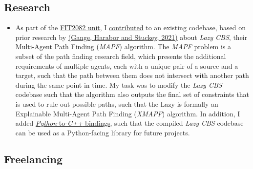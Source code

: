 \documentclass[a4paper]{article}
\begin{document}
	\subsection{Research}
	\begin{itemize}
		\item As part of the \href{https://handbook.monash.edu/2021/units/FIT2082}{FIT2082 unit}, I \href{https://github.com/AppleGamer22/FIT2082}{contributed} to an existing codebase, based on prior research by \href{https://ojs.aaai.org/index.php/ICAPS/article/view/3471}{(Gange, Harabor and Stuckey, 2021)} about \textsl{Lazy CBS}, their Multi-Agent Path Finding (\textsl{MAPF}) algorithm. The \textsl{MAPF} problem is a subset of the path finding research field, which presents the additional requirements of multiple agents, each with a unique pair of a source and a target, such that the path between them does not intersect with another path during the same point in time. My task was to modify the \textsl{Lazy CBS} codebase such that the algorithm also outputs the final set of constraints that is used to rule out possible paths, such that the Lazy is formally an Explainable Multi-Agent Path Finding (\textsl{XMAPF}) algorithm. In addition, I added \href{https://pybind11.readthedocs.io/en/stable/}{\textsl{Python}-to-\textsl{C++} bindings}, such that the compiled \textsl{Lazy CBS} codebase can be used as a Python-facing library for future projects.
	\end{itemize}

	\subsection{Freelancing}
\end{document}
